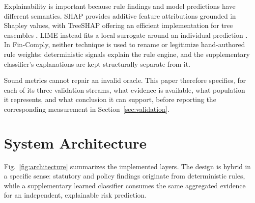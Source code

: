 \documentclass[11pt,a4paper]{article}
\newcommand{\system}{Fin-Comply}
\begin{document}
Explainability is important because rule findings and model predictions have different semantics. SHAP provides additive feature attributions grounded in Shapley values, with TreeSHAP offering an efficient implementation for tree ensembles \cite{lundberg2017,lundberg2020}. LIME instead fits a local surrogate around an individual prediction \cite{ribeiro}. In \system, neither technique is used to rename or legitimize hand-authored rule weights: deterministic signals explain the rule engine, and the supplementary classifier's explanations are kept structurally separate from it.

Sound metrics cannot repair an invalid oracle. This paper therefore specifies, for each of its three validation streams, what evidence is available, what population it represents, and what conclusion it can support, before reporting the corresponding measurement in Section~\ref{sec:validation}.

\section{System Architecture}
\label{sec:architecture}
Fig.~\ref{fig:architecture} summarizes the implemented layers. The design is hybrid in a specific sense: statutory and policy findings originate from deterministic rules, while a supplementary learned classifier consumes the same aggregated evidence for an independent, explainable risk prediction.
\end{document}
